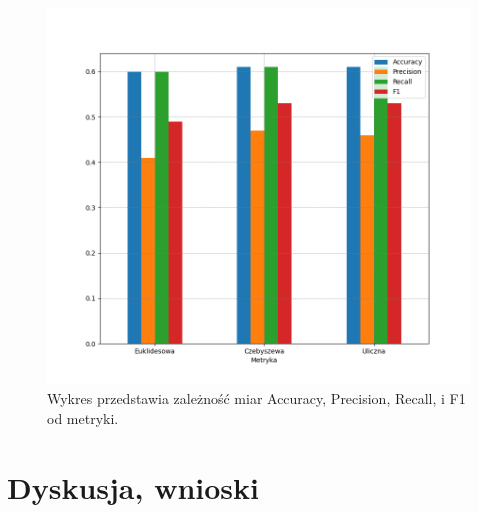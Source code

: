 \documentclass{classrep}
\begin{document}
\newpage

\begin{figure}[h!]
 \centering
 \includegraphics[width=15cm]{wykres_metryka.png}
 \vspace{-0.3cm}
 \caption{Wykres przedstawia zależność miar Accuracy, Precision, Recall, i F1 od metryki.}
 \label{wykres2}
\end{figure}



\section{Dyskusja, wnioski}
\end{document}
